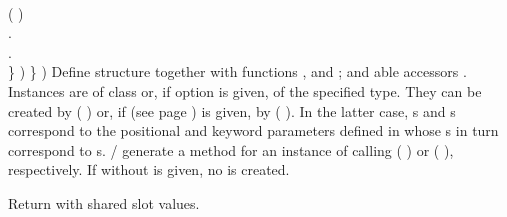 \begin{LIST}{1cm}
{{{{{            \\
            ( )\\
          }{.}\\
        }{.}\\
      }{\}}%
      )%
    }{\}}
    )}
  {
    Define structure  together with functions
    ,  and
    ; and able accessors
    \LIT{-}. Instances are of class  or, if 
     option  is given, of the specified type.
    They can be
    created by ( ) or, if  (see
    page \pageref{section:Functions}) is given, by (
     ). In the latter
    case, s and \kwd{:}s correspond to the positional
    and keyword parameters defined in  whose
    s in turn correspond to s.
    / generate a
     method for an instance  of 
    calling (  ) or (
      ), respectively.
    If  without  is given, no 
    is created.
}

  {
    Return  with shared slot values.
  }

\end{LIST}




